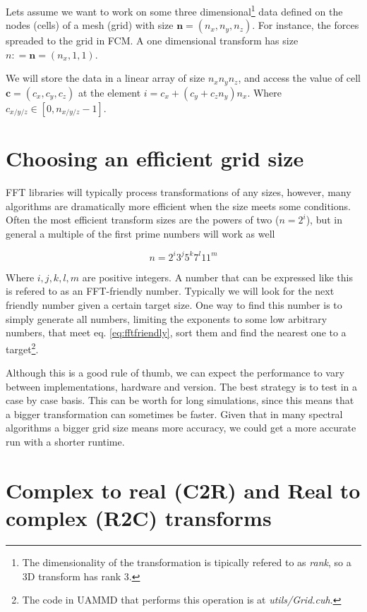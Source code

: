 \documentclass[ twoside,openright,titlepage,numbers=noenddot,%
headinclude,footinclude,cleardoublepage=empty,abstract=on,
BCOR=5mm,paper=a4,fontsize=11pt, dvipsnames
]{scrreprt}
\renewcommand{\vec}[1]{\bm{#1}}
\newcommand{\uammd}{\gls{UAMMD}\xspace}
\begin{document}
Lets assume we want to work on some three dimensional\footnote{The dimensionality of the transformation is tipically refered to as \emph{rank}, so a 3D transform has rank 3.} data defined on the nodes (cells) of a mesh (grid) with size $\vec{n} = (n_x, n_y, n_z)$. For instance, the forces spreaded to the grid in \gls{FCM}.
A one dimensional transform has size $n: = \vec{n} =(n_x,1,1)$.

We will store the data in a linear array of size $n_xn_yn_z$, and access the value of cell $\vec{c} = (c_x,c_y,c_z)$ at the element $i = c_x + (c_y + c_zn_y)n_x$. Where $c_{x/y/z} \in [0, n_{x/y/z}-1]$.

\section*{Choosing an efficient grid size}
\gls{FFT} libraries will typically process transformations of any sizes, however, many algorithms are dramatically more efficient when the size meets some conditions. Often the most efficient transform sizes are the powers of two ($n = 2^i$), but in general a multiple of the first prime numbers will work as well

\begin{equation}
  \label{eq:fftfriendly}
n = 2^i3^j5^k7^l11^m
\end{equation}

Where $i,j,k,l,m$ are positive integers. A number that can be expressed like this is refered to as an \gls{FFT}-friendly number.
Typically we will look for the next friendly number given a certain target size. One way to find this number is to simply generate all numbers, limiting the exponents to some low arbitrary numbers, that meet eq. \eqref{eq:fftfriendly}, sort them and find the nearest one to a target\footnote{The code in \uammd that performs this operation is at \emph{utils/Grid.cuh}.}.

Although this is a good rule of thumb, we can expect the performance to vary between implementations, hardware and version. The best strategy is to test in a case by case basis. This can be worth for long simulations, since this means that a bigger transformation can sometimes be faster. Given that in many spectral algorithms a bigger grid size means more accuracy, we could get a more accurate run with a shorter runtime.


\section*{Complex to real (C2R) and Real to complex (R2C) transforms}
\end{document}
